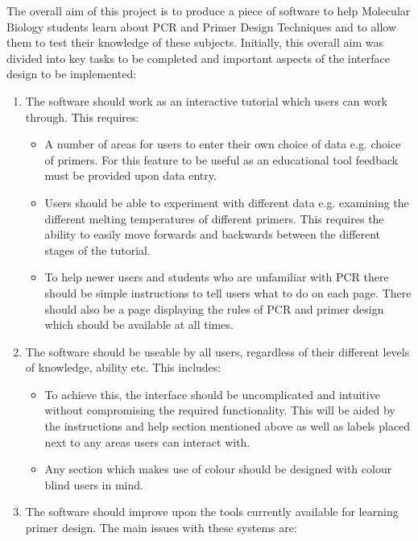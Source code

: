 The overall aim of this project is to produce a piece of software to help Molecular Biology students learn about PCR and Primer Design Techniques and to allow them to test their knowledge of these subjects. Initially, this overall aim was divided into key tasks to be completed and important aspects of the interface design to be implemented:

\begin {enumerate}

\item The software should work as an interactive tutorial which users can work through. This requires:

\begin {itemize}
\item A number of areas for users to enter their own choice of data e.g. choice of primers. For this feature to be useful as an educational tool feedback must be provided upon data entry.
\item Users should be able to experiment with different data e.g. examining the different melting temperatures of different primers. This requires the ability to easily move forwards and backwards between the different stages of the tutorial.
\item To help newer users and students who are unfamiliar with PCR there should be simple instructions to tell users what to do on each page. There should also be a page displaying the rules of PCR and primer design which should be available at all times.
\end {itemize}

\item The software should be useable by all users, regardless of their different levels of knowledge, ability etc. This includes:

\begin {itemize}
\item To achieve this, the interface should be uncomplicated and intuitive without compromising the required functionality. This will be aided by the instructions and help section mentioned above as well as labels placed next to any areas users can interact with.
\item Any section which makes use of colour should be designed with colour blind users in mind.
\end {itemize}

\item The software should improve upon the tools currently available for learning primer design. The main issues with these systems are: 


\end{enumerate}
